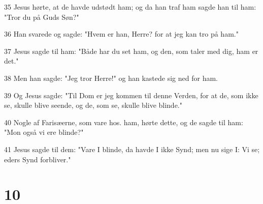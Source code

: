 \par 35 Jesus hørte, at de havde udstødt ham; og da han traf ham sagde han til ham: "Tror du på Guds Søn?"
\par 36 Han svarede og sagde: "Hvem er han, Herre? for at jeg kan tro på ham."
\par 37 Jesus sagde til ham: "Både har du set ham, og den, som taler med dig, ham er det."
\par 38 Men han sagde: "Jeg tror Herre!" og han kastede sig ned for ham.
\par 39 Og Jesus sagde: "Til Dom er jeg kommen til denne Verden, for at de, som ikke se, skulle blive seende, og de, som se, skulle blive blinde."
\par 40 Nogle af Farisæerne, som vare hos. ham, hørte dette, og de sagde til ham: "Mon også vi ere blinde?"
\par 41 Jesus sagde til dem: "Vare I blinde, da havde I ikke Synd; men nu sige I: Vi se; eders Synd forbliver."

\chapter{10}

